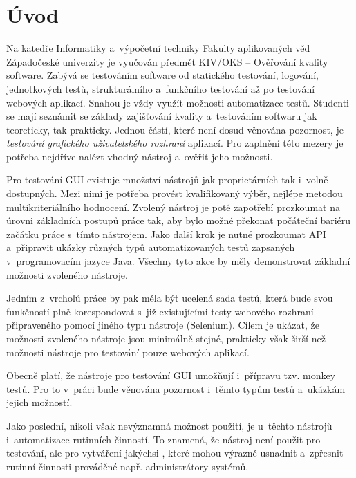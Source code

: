 \chapter{Úvod}
Na katedře Informatiky a~výpočetní techniky Fakulty aplikovaných věd Západočeské univerzity je vyučován předmět KIV/OKS -- Ověřování kvality software. Zabývá se testováním software od statického testování, logování, jednotkových testů, strukturálního a~funkčního testování až po testování webových aplikací. Snahou je vždy využít možnosti automatizace testů. Studenti se mají seznámit se základy zajišťování kvality a~testováním softwaru jak teoreticky, tak prakticky. Jednou částí, které není dosud věnována pozornost, je \emph{testování grafického uživatelského rozhraní} aplikací. Pro zaplnění této mezery je potřeba nejdříve nalézt vhodný nástroj a~ověřit jeho možnosti.

Pro testování GUI existuje množství nástrojů jak proprietárních tak i~volně dostupných. Mezi nimi je potřeba provést kvalifikovaný výběr, nejlépe metodou multikriteriálního hodnocení. Zvolený nástroj je poté zapotřebí prozkoumat na úrovni základních postupů práce tak, aby bylo možné překonat počáteční bariéru začátku práce s~tímto nástrojem. Jako další krok je nutné prozkoumat API a~připravit ukázky různých typů automatizovaných testů zapsaných v~programovacím jazyce Java. Všechny tyto akce by měly demonstrovat základní možnosti zvoleného nástroje.

Jedním z~vrcholů práce by pak měla být ucelená sada testů, která bude svou funkčností plně korespondovat s~již existujícími testy webového rozhraní připraveného pomocí jiného typu nástroje (Selenium). Cílem je ukázat, že možnosti zvoleného nástroje jsou minimálně stejné, prakticky však širší než možnosti nástroje pro testování pouze webových aplikací.

Obecně platí, že nástroje pro testování GUI umožňují i~přípravu tzv. monkey testů. Pro to v~práci bude věnována pozornost i~těmto typům testů a~ukázkám jejich možností.

Jako poslední, nikoli však nevýznamná možnost použití, je u~těchto nástrojů i~automatizace rutinních činností. To znamená, že nástroj není použit pro testování, ale pro vytváření jakýchsi , které mohou výrazně usnadnit a~zpřesnit rutinní činnosti  prováděné např. administrátory systémů.